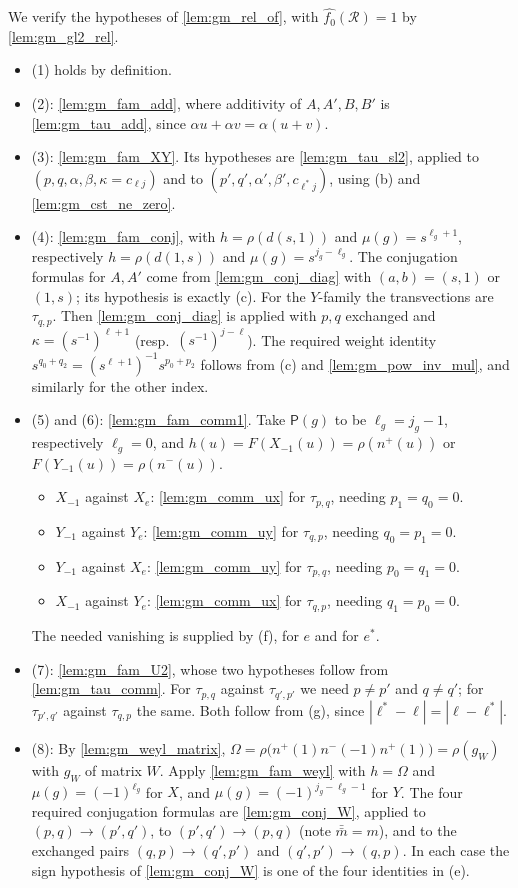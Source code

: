 \documentclass[11pt]{article}
\theoremstyle{definition}
\theoremstyle{remark}
\begin{document}
We verify the hypotheses of \cref{lem:gm_rel_of}, with $\widehat{f_0}(\mathcal R)=1$ by \cref{lem:gm_gl2_rel}.
\begin{itemize}
\item (1) holds by definition.
\item (2): \cref{lem:gm_fam_add}, where additivity of $A,A',B,B'$ is \cref{lem:gm_tau_add}, since $\alpha u+\alpha v=\alpha(u+v)$.
\item (3): \cref{lem:gm_fam_XY}. Its hypotheses are \cref{lem:gm_tau_sl2}, applied to $(p,q,\alpha,\beta,\kappa=c_{\ell j})$ and to $(p',q',\alpha',\beta',c_{\ell^\ast j})$, using (b) and \cref{lem:gm_cst_ne_zero}.
\item (4): \cref{lem:gm_fam_conj}, with $h=\rho(d(s,1))$ and $\mu(g)=s^{\ell_g+1}$, respectively $h=\rho(d(1,s))$ and $\mu(g)=s^{j_g-\ell_g}$. The conjugation formulas for $A,A'$ come from \cref{lem:gm_conj_diag} with $(a,b)=(s,1)$ or $(1,s)$; its hypothesis is exactly (c). For the $Y$-family the transvections are $\tau_{q,p}$. Then \cref{lem:gm_conj_diag} is applied with $p,q$ exchanged and $\kappa=(s^{-1})^{\ell+1}$ (resp.\ $(s^{-1})^{j-\ell}$). The required weight identity $s^{q_0+q_2}=(s^{\ell+1})^{-1}s^{p_0+p_2}$ follows from (c) and \cref{lem:gm_pow_inv_mul}, and similarly for the other index.
\item (5) and (6): \cref{lem:gm_fam_comm1}. Take $\mathsf P(g)$ to be $\ell_g=j_g-1$, respectively $\ell_g=0$, and $h(u)=F(X_{-1}(u))=\rho(n^+(u))$ or $F(Y_{-1}(u))=\rho(n^-(u))$.
  \begin{itemize}
  \item $X_{-1}$ against $X_e$: \cref{lem:gm_comm_ux} for $\tau_{p,q}$, needing $p_1=q_0=0$.
  \item $Y_{-1}$ against $Y_e$: \cref{lem:gm_comm_uy} for $\tau_{q,p}$, needing $q_0=p_1=0$.
  \item $Y_{-1}$ against $X_e$: \cref{lem:gm_comm_uy} for $\tau_{p,q}$, needing $p_0=q_1=0$.
  \item $X_{-1}$ against $Y_e$: \cref{lem:gm_comm_ux} for $\tau_{q,p}$, needing $q_1=p_0=0$.
  \end{itemize}
  The needed vanishing is supplied by (f), for $e$ and for $e^\ast$.
\item (7): \cref{lem:gm_fam_U2}, whose two hypotheses follow from \cref{lem:gm_tau_comm}. For $\tau_{p,q}$ against $\tau_{q',p'}$ we need $p\ne p'$ and $q\neq q'$; for $\tau_{p',q'}$ against $\tau_{q,p}$ the same. Both follow from (g), since $|\ell^\ast-\ell|=|\ell-\ell^\ast|$.
\item (8): By \cref{lem:gm_weyl_matrix}, $\Omega=\rho\bigl(n^+(1)n^-(-1)n^+(1)\bigr)=\rho(g_W)$ with $g_W$ of matrix $W$. Apply \cref{lem:gm_fam_weyl} with $h=\Omega$ and $\mu(g)=(-1)^{\ell_g}$ for $X$, and $\mu(g)=(-1)^{j_g-\ell_g-1}$ for $Y$. The four required conjugation formulas are \cref{lem:gm_conj_W}, applied to $(p,q)\to(p',q')$, to $(p',q')\to(p,q)$ (note $\bar{\bar m}=m$), and to the exchanged pairs $(q,p)\to(q',p')$ and $(q',p')\to(q,p)$. In each case the sign hypothesis of \cref{lem:gm_conj_W} is one of the four identities in (e).
\end{itemize}
\end{document}
